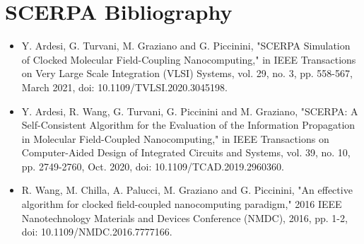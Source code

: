 \documentclass[a4paper,10pt]{article}
\begin{document}
\section{SCERPA Bibliography}\label{sec:biblio}

\begin{itemize}
	\item Y. Ardesi, G. Turvani, M. Graziano and G. Piccinini, "SCERPA Simulation of Clocked Molecular Field-Coupling Nanocomputing," in IEEE Transactions on Very Large Scale Integration (VLSI) Systems, vol. 29, no. 3, pp. 558-567, March 2021, doi: 10.1109/TVLSI.2020.3045198.
	\item Y. Ardesi, R. Wang, G. Turvani, G. Piccinini and M. Graziano, "SCERPA: A Self-Consistent Algorithm for the Evaluation of the Information Propagation in Molecular Field-Coupled Nanocomputing," in IEEE Transactions on Computer-Aided Design of Integrated Circuits and Systems, vol. 39, no. 10, pp. 2749-2760, Oct. 2020, doi: 10.1109/TCAD.2019.2960360.
	\item R. Wang, M. Chilla, A. Palucci, M. Graziano and G. Piccinini, "An effective algorithm for clocked field-coupled nanocomputing paradigm," 2016 IEEE Nanotechnology Materials and Devices Conference (NMDC), 2016, pp. 1-2, doi: 10.1109/NMDC.2016.7777166.
\end{itemize}
\end{document}
